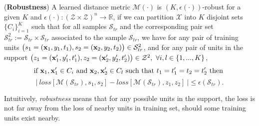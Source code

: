 
\begin{define}
(\textbf{Robustness})
\label{def:robust}
A learned distance metric $\mathcal{M}(\cdot)$ is $(K,\epsilon(\cdot))$-robust for a given $K$ and $\epsilon(\cdot):(\mathcal{Z}\times\mathcal{Z})^n \to \mathbb{R}$, if we can partition $\mathcal{X}$ into $K$ disjoint sets $\{C_i\}_{i=1}^K$ such that for all samples $\mathcal{S}_{tr}$ and the corresponding pair set $\mathcal{S}_{tr}^2 := \mathcal{S}_{tr} \times \mathcal{S}_{tr}$ associated to the sample $\mathcal{S}_{tr}$, we have for any pair of training units
$\big(s_1=(\mathbf{x}_1,y_1,t_1),s_2=(\mathbf{x}_2,y_2,t_2)\big)\in\mathcal{S}_{tr}^2$, and for any pair of units in the support $\big(z_1=(\mathbf{x}'_1,y'_1,t'_1),z_2=(\mathbf{x}'_2,y'_2,t'_2)\big)\in\mathcal{Z}^2,~\forall i,l \in \{1,...,K\}$, 
$$\text{if } \mathbf{x}_1,\mathbf{x}'_1 \in C_i \text{ and }  \mathbf{x}_2,\mathbf{x}'_2 \in C_l \text{ such that } t_1=t'_1=t_2=t'_2  \text{ then }$$ $$\Big|~ loss[\mathcal{M}(\mathcal{S}_{tr}),s_1,s_2] - loss[\mathcal{M}(\mathcal{S}_{tr}),z_1,z_2]~ \Big|\leq \epsilon(\mathcal{S}_{tr}).$$
\end{define}
Intuitively, \textit{robustness} means that for any possible units in the support, the loss is not far away from the loss of nearby units in training set, should some training units exist nearby. 

